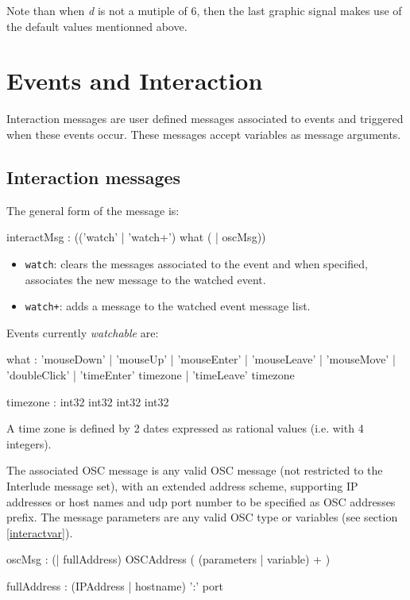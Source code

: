 \documentclass[a4paper,twoside]{report}
\newcommand{\toplevel}[1]	{\chapter{#1}}
\newcommand{\sublevel}[1]	{\section{#1}}
\newcommand{\OSC}[1]		{\texttt{#1}}
\begin{document}
Note than when \textit{d} is not a mutiple of 6, then the last graphic signal makes use of the default values mentionned above.

\toplevel{ Events and Interaction}
\label{interaction}

Interaction messages are user defined messages associated to events and triggered when these events occur. These messages accept variables as message arguments.

\sublevel{ Interaction messages}
\label{interactmsg}

The general form of the message is:

\begin{rail}
interactMsg : (('watch' | 'watch+')  what  ( | oscMsg)) 
\end{rail}

\begin{itemize}
\item \OSC{watch}: clears the messages associated to the event and when specified, associates the new message to the watched event. 
\item \OSC{watch+}: adds a message to the watched event message list. 
\end{itemize}

Events currently \emph{watchable} are:
\begin{rail}
what : 'mouseDown' | 'mouseUp' | 'mouseEnter' | 'mouseLeave' | 'mouseMove' | 'doubleClick' | 'timeEnter' timezone | 'timeLeave' timezone
\end{rail}

\begin{rail}
timezone : int32 int32 int32 int32
\end{rail}
A time zone is defined by 2 dates expressed as rational values (i.e. with 4 integers).


The associated OSC message is any valid OSC message (not restricted to the Interlude message set), with an extended address scheme, supporting IP addresses or host names and udp port number to be specified as OSC addresses prefix. The message parameters are any valid OSC type or variables (see section \ref{interactvar}).
\begin{rail} 
oscMsg : (| fullAddress)  OSCAddress ( (parameters | variable) + )
\end{rail}

\begin{rail} 
fullAddress : (IPAddress | hostname) ':' port
\end{rail}
\end{document}

